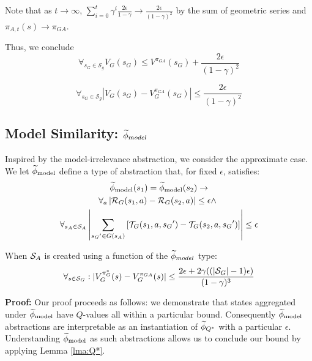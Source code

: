 Note that as $t \rightarrow \infty$, $\sum_{i=0}^{t}\gamma^i \frac{2\epsilon}{1-\gamma} \rightarrow \frac{2\epsilon}{(1-\gamma)^2}$ by the sum of geometric series and $\pi_{A,t}(s) \rightarrow \pi_{GA}$.

Thus, we conclude
\begin{equation*}
\forall_{s_G \in \mathcal{S}_g} V_G(s_G) \leq  V^{\pi_{GA}}(s_G) + \frac{2\epsilon}{(1-\gamma)^2}
\end{equation*}

\begin{equation*}
\forall_{s_G \in \mathcal{S}_g} \left | V_G(s_G) - V_G^{\pi_{GA}}(s_G) \right | \leq  \frac{2\epsilon}{(1-\gamma)^2}
\end{equation*}



\subsection{Model Similarity: $\widetilde \phi_{model}$}
\label{sec:model}

Inspired by the model-irrelevance abstraction, we consider the approximate case. 
\bdefn{$\epM$}
We let $\epM$ define a type of abstraction that, for fixed $\epsilon$, satisfies:
\begin{multline}
\widetilde \phi_{\text{model}}(s_1) = \widetilde \phi_{\text{model}}(s_2) \rightarrow \\
\forall_a \left| \mathcal{R}_G(s_1, a) - \mathcal{R}_G(s_2, a)\right| \leq \epsilon \wedge\ \\
\forall_{s_A \in \mathcal{S}_A} \left|\sum_{{s_G}' \in G(s_A)} \left[\mathcal{T}_G(s_1, a, {s_G}') - \mathcal{T}_G(s_2, a,{s_G}')\right] \right| \leq \epsilon
\end{multline}
\edefn

\begin{lma}
\label{lma:model}
When $\mathcal{S}_A$ is created using a function of the $\widetilde \phi_{model}$ type:
\begin{equation}
\forall_{s \in \mathcal{S}_G} : | V_G^{\pi_G^*}(s) - V_G^{\pi_{GA}}(s) | \leq \frac{2\epsilon + 2\gamma((|\mathcal{S}_G|-1)\epsilon)}{(1-\gamma)^3}
\end{equation}
\end{lma}

{\bf Proof:} Our proof proceeds as follows: we demonstrate that states aggregated under $\epM$ have $Q$-values all within a particular bound. Consequently $\epM$ abstractions are interpretable as an instantiation of $\widetilde \phi_{Q^*}$ with a particular $\epsilon$. Understanding $\epM$ as such abstractions allows us to conclude our bound by applying Lemma \ref{lma:Q*}.

